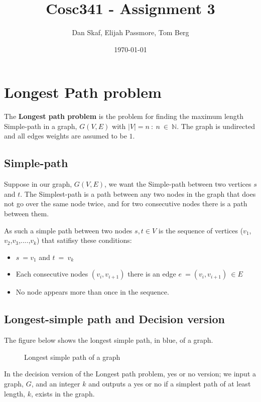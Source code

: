 \documentclass[a4paper,11pt]{article}
\title{Cosc341 - Assignment 3}
\author{Dan Skaf, Elijah Passmore, Tom Berg}
\date{\today}
\begin{document}
\maketitle

\section{Longest Path problem}
The \textbf{Longest path problem} is the problem for finding the maximum length 
Simple-path in a graph, $G(V,E)$ with $\left|V\right|=n\::\:n\:\in\:\mathbb{N}$.
The graph is undirected and all edges weights are assumed to be $1$.

    \subsection{Simple-path} 
    Suppose in our graph, $G(V,E)$, we want the Simple-path between two vertices 
    $s$ and $t$. The Simplest-path is a path between any two nodes in the graph 
    that does not go over the same node twice, and for two consecutive nodes 
    there is a path between them.

    As such a simple path between two nodes $s,t\in V$ is the sequence of 
    vertices ($v_1$,$v_2$,$v_3$,$....$,$v_k$) that satifisy these conditions:
    \begin{itemize}
        \item $s\:=v_1$ and $t\:=\:v_k$
        \item Each consecutive nodes $\left(v_i,v_{i+1}\right)$ there is an 
        edge $e\:=\left(v_i,v_{i+1}\right)\:\in E$
        \item No node appears more than once in the sequence.
    \end{itemize}
    \pagebreak

    \subsection{Longest-simple path and Decision version}
    The figure below shows the longest simple path, in blue, of a graph.
    \begin{figure}[!h]
        \centering {}
        \caption{Longest simple path of a graph}
    \end{figure}

    In the decision version of the Longest path problem, yes or no version; 
    we input a graph, $G$, and an integer $k$ and outputs a yes or no if a 
    simplest path of at least length, $k$, exists in the graph.
\end{document}
